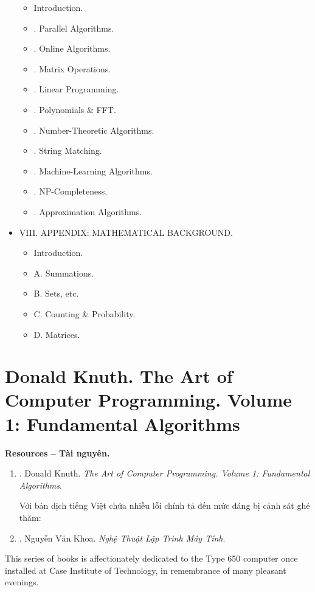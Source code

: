 \documentclass{article}
\begin{document}
\begin{itemize}
\begin{itemize}
		\item {\sf Introduction.}
		\item {. Parallel Algorithms.}
		\item {. Online Algorithms.}
		\item {. Matrix Operations.}
		\item {. Linear Programming.}
		\item {. Polynomials \& FFT.}
		\item {. Number-Theoretic Algorithms.}
		\item {. String Matching.}
		\item {. Machine-Learning Algorithms.}
		\item {. NP-Completeness.}
		\item {. Approximation Algorithms.}
	\end{itemize}
	\item {\sf VIII. APPENDIX: MATHEMATICAL BACKGROUND.}
	\begin{itemize}
		\item {\sf Introduction.}
		\item {\sf A. Summations.}
		\item {\sf B. Sets, etc.}
		\item {\sf C. Counting \& Probability.}
		\item {\sf D. Matrices.}
	\end{itemize}
\end{itemize}


\section{{\sc Donald Knuth}. The Art of Computer Programming. Volume 1: Fundamental Algorithms}
\textbf{\textsf{Resources -- Tài nguyên.}}
\begin{enumerate}
	\item \cite{Knuth1997}. {\sc Donald Knuth}. {\it The Art of Computer Programming. Volume 1: Fundamental Algorithms}.
	
	Với bản dịch tiếng Việt chứa nhiều lỗi chính tả đến mức đáng bị cảnh sát ghé thăm:
	\item \cite{Khoa_art_programming}. {\sc Nguyễn Văn Khoa}. {\it Nghệ Thuật Lập Trình Máy Tính}.
\end{enumerate}
This series of books is affectionately dedicated to the Type 650 computer once installed at Case Institute of Technology, in remembrance of many pleasant evenings.
\end{document}
